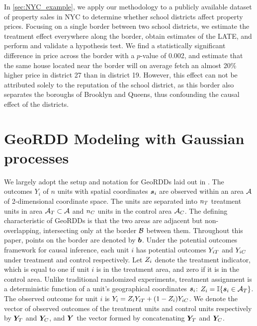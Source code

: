 In \autoref{sec:NYC_example}, we apply our methodology to a publicly available dataset of property sales in NYC to determine whether school districts affect property prices.
Focusing on a single border between two school districts, we estimate the treatment effect everywhere along the border, obtain estimates of the LATE, and perform and validate a hypothesis test.
We find a statistically significant difference in price across the border with a \(p\)-value of 0.002, and estimate that the same house located near the border will on average fetch an almost 20\% higher price in district 27 than in district 19.
However, this effect can not be attributed solely to the reputation of the school district, as this border also separates the boroughs of Brooklyn and Queens, thus confounding the causal effect of the districts.

\section{GeoRDD Modeling with Gaussian processes}
\label{sec:geordd_model}

We largely adopt the setup and notation for GeoRDDs laid out in \cite{keele_titiunik_2015}.
The outcomes \(Y_i\) of \(n\) units with spatial coordinates \(\bm{s}_i\) are observed within an area \(\mathcal{A}\) of 2-dimensional coordinate space.
The units are separated into \(n_T\) treatment units in area \(\mathcal{A}{}_{T} \subset \mathcal{A}\)
and \(n_C\) units in the control area \(\mathcal{A}{}_{C}\).
The defining characteristic of GeoRDDs is that the two areas are adjacent but non-overlapping, intersecting only at the border \(\mathcal{B}\) between them.
Throughout this paper, points on the border are denoted by \(\bm{b}\).
Under the potential outcomes framework for causal inference, each unit \(i\) has potential outcomes \(Y_{iT}\) and \(Y_{iC}\) under treatment and control respectively.
Let \(Z_i\) denote the treatment indicator, which is equal to one if unit \(i\) is in the treatment area, and zero if it is in the control area.
Unlike traditional randomized experiments, treatment assignment is a deterministic function of a unit's geographical coordinates \(\bm{s}_i\): \(\treatind_i = \Ind\cbr{\svec_i \in \treatarea}\).
The observed outcome for unit \(i\) is \(Y_i = Z_i Y_{iT} + (1 - Z_i) Y_{iC}\).
We denote the vector of observed outcomes of the treatment units and control units respectively by \(\bm{Y}_{T}\) and \(\bm{Y}_{C}\), and \(\bm{Y}\) the vector formed by concatenating \(\bm{Y}_{T}\) and \(\bm{Y}_{C}\).

